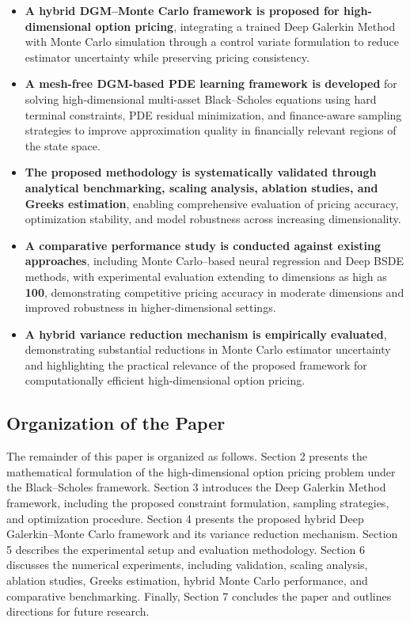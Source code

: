 \documentclass[12pt, a4paper]{article}
\begin{document}
\begin{itemize}

    \item \textbf{A hybrid DGM--Monte Carlo framework is proposed for
    high-dimensional option pricing}, integrating a trained Deep
    Galerkin Method with Monte Carlo simulation through a control
    variate formulation to reduce estimator uncertainty while
    preserving pricing consistency.

    \item \textbf{A mesh-free DGM-based PDE learning framework is
    developed} for solving high-dimensional multi-asset Black--Scholes
    equations using hard terminal constraints, PDE residual
    minimization, and finance-aware sampling strategies to improve
    approximation quality in financially relevant regions of the state
    space.

    \item \textbf{The proposed methodology is systematically validated
    through analytical benchmarking, scaling analysis, ablation
    studies, and Greeks estimation}, enabling comprehensive evaluation
    of pricing accuracy, optimization stability, and model robustness
    across increasing dimensionality.

    \item \textbf{A comparative performance study is conducted against
    existing approaches}, including Monte Carlo--based neural
    regression and Deep BSDE methods, with experimental evaluation
    extending to dimensions as high as \textbf{100}, demonstrating
    competitive pricing accuracy in moderate dimensions and improved
    robustness in higher-dimensional settings.

    \item \textbf{A hybrid variance reduction mechanism is empirically
    evaluated}, demonstrating substantial reductions in Monte Carlo
    estimator uncertainty and highlighting the practical relevance of
    the proposed framework for computationally efficient
    high-dimensional option pricing.

\end{itemize}

\subsection{Organization of the Paper}

The remainder of this paper is organized as follows. Section 2
presents the mathematical formulation of the high-dimensional option
pricing problem under the Black--Scholes framework. Section 3
introduces the Deep Galerkin Method framework, including the proposed
constraint formulation, sampling strategies, and optimization
procedure. Section 4 presents the proposed hybrid Deep
Galerkin--Monte Carlo framework and its variance reduction mechanism.
Section 5 describes the experimental setup and evaluation
methodology. Section 6 discusses the numerical experiments, including
validation, scaling analysis, ablation studies, Greeks estimation,
hybrid Monte Carlo performance, and comparative benchmarking. Finally,
Section 7 concludes the paper and outlines directions for future
research.
\end{document}
